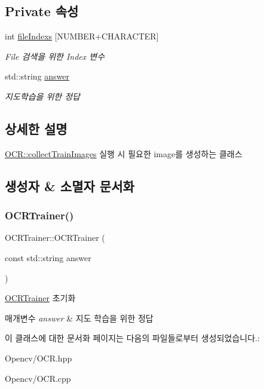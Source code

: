 \subsection*{Private 속성}
\begin{DoxyCompactItemize}
\item 
\mbox{\label{class_o_c_r_trainer_a9d8b8a5e578dfbe9b71f86d80662c667}} 
int \hyperlink{class_o_c_r_trainer_a9d8b8a5e578dfbe9b71f86d80662c667}{file\+Indexs} \mbox{[}N\+U\+M\+B\+ER+C\+H\+A\+R\+A\+C\+T\+ER\mbox{]}
\begin{DoxyCompactList}\small\item\em File 검색을 위한 Index 변수 \end{DoxyCompactList}\item 
\mbox{\label{class_o_c_r_trainer_a8581e40fcbb646332572248938094b81}} 
std\+::string \hyperlink{class_o_c_r_trainer_a8581e40fcbb646332572248938094b81}{answer}
\begin{DoxyCompactList}\small\item\em 지도학습을 위한 정답 \end{DoxyCompactList}\end{DoxyCompactItemize}


\subsection{상세한 설명}
\hyperlink{class_o_c_r_a9d4b78ff145b1e89ac05eb0f194d1948}{O\+C\+R\+::collect\+Train\+Images} 실행 시 필요한 image를 생성하는 클래스 

\subsection{생성자 \& 소멸자 문서화}
\mbox{\label{class_o_c_r_trainer_abd29826f033646e6937bc07af133d599}} 
\subsubsection{\texorpdfstring{O\+C\+R\+Trainer()}{OCRTrainer()}}
{\footnotesize\ttfamily O\+C\+R\+Trainer\+::\+O\+C\+R\+Trainer (\begin{DoxyParamCaption}\item[{const std\+::string}]{answer }\end{DoxyParamCaption})}



\hyperlink{class_o_c_r_trainer}{O\+C\+R\+Trainer} 초기화 


\begin{DoxyParams}{매개변수}
{\em answer} & 지도 학습을 위한 정답 \\
\hline
\end{DoxyParams}


이 클래스에 대한 문서화 페이지는 다음의 파일들로부터 생성되었습니다.\+:\begin{DoxyCompactItemize}
\item 
Opencv/O\+C\+R.\+hpp\item 
Opencv/O\+C\+R.\+cpp\end{DoxyCompactItemize}
